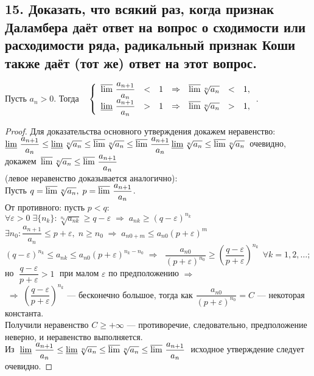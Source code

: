 \documentclass[a4paper, fleqn]{article}
\begin{document}
    \subsection*{15. Доказать, что всякий раз, когда признак Даламбера даёт ответ на вопрос о сходимости или расходимости ряда, 
	радикальный признак Коши также даёт (тот же) ответ на этот вопрос.}
        Пусть $a_n > 0$. Тогда 
	$\;\;\; \left\{\begin{array}{lllllll}
	\varlimsup \, \dfrac{a_{n+1}}{a_n} & < & 1 & \Rightarrow & \varlimsup \sqrt[n]{a_n} & < & 1,\\[5 pt]
	\varliminf \, \dfrac{a_{n+1}}{a_n} & > & 1 & \Rightarrow & \varlimsup \sqrt[n]{a_n} & > & 1,\\[5 pt]
	\end{array}\right.$. \\
	\begin{proof}
	Для доказательства основного утверждения докажем неравенство: \\[3 pt]
	$\varliminf \, \dfrac{a_{n+1}}{a_n} \le \varliminf \sqrt[n]{a_n} \le \varlimsup \sqrt[n]{a_n} \le \varlimsup \, \dfrac{a_{n+1}}{a_n} \\[3 pt]
	\varliminf \sqrt[n]{a_n} \le \varlimsup \sqrt[n]{a_n} \,$ очевидно, докажем 
	$\, \varlimsup \sqrt[n]{a_n} \le \varlimsup \, \dfrac{a_{n+1}}{a_n}$ \\[3 pt]
	(левое неравенство доказывается аналогично): \\[3 pt]
	Пусть $q = \varlimsup \sqrt[n]{a_n}, \; p = \varlimsup \, \dfrac{a_{n+1}}{a_n}$. \\[3 pt]
	От противного: пусть $p < q$:\\[3 pt]
	$\forall \varepsilon > 0 \; \exists \{ n_k \} : \sqrt[n_k]{a_{nk}} \ge q - \varepsilon \; \Rightarrow \; a_{nk} \ge (q - \varepsilon)^{n_k}$ \\[3 pt]
	$\exists n_0 : \dfrac{a_{n+1}}{a_n} \le p + \varepsilon, \; n \ge n_0 \; \Rightarrow \; a_{n0 + m} \le a_{n0} (p + \varepsilon)^m$ \\[3 pt]
	$(q - \varepsilon)^{n_k} \le a_{nk} \le a_{n0} (p + \varepsilon)^{n_k - n_0} \; \Rightarrow \; $
	$\dfrac{a_{n0}}{(p + \varepsilon)^{n_0}} \ge \left( \dfrac{q - \varepsilon}{p + \varepsilon} \right)^{n_k} \;\, \forall k = 1, 2, \dots;$ \\[3 pt]
	но $\; \dfrac{q - \varepsilon}{p + \varepsilon} > 1 \; $ при малом $\varepsilon$ по предположению $\Rightarrow$ \\[3 pt]
	$\; \Rightarrow \; \left( \dfrac{q - \varepsilon}{p + \varepsilon} \right)^{n_k}$ --- бесконечно большое, тогда как
	$\dfrac{a_{n0}}{(p + \varepsilon)^{n_0}} = C$ --- некоторая константа. \\[3 pt]
	Получили неравенство $C \ge +\infty$ --- противоречие, следовательно, предположение неверно, и неравенство выполняется. \\[3 pt]
	Из $\; \varliminf \, \dfrac{a_{n+1}}{a_n} \le \varliminf \sqrt[n]{a_n} \le \varlimsup \sqrt[n]{a_n} \le \varlimsup \, \dfrac{a_{n+1}}{a_n}\; $ 
        исходное утверждение следует очевидно.
	\end{proof}    
        
\end{document}
